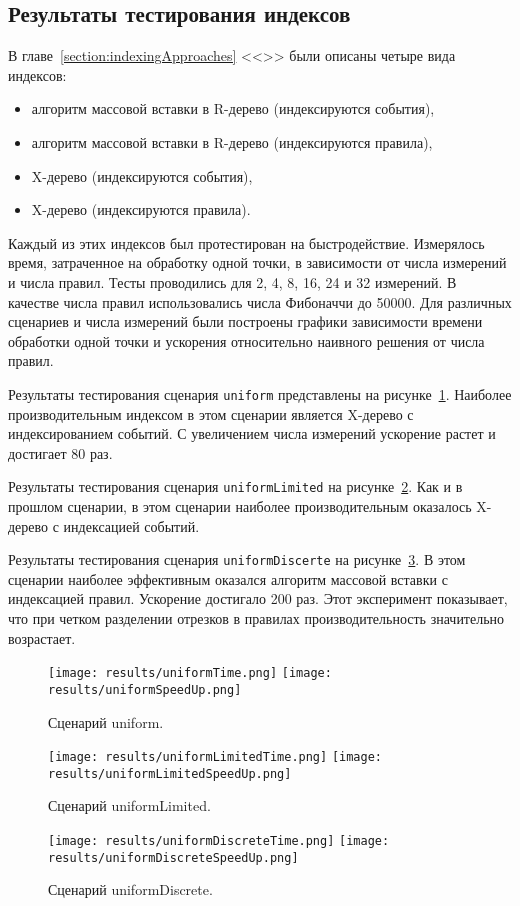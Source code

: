 \documentclass[14pt]{article}
\begin{document}
\subsection{Результаты тестирования индексов}
В главе~\ref{section:indexingApproaches} <<>> были описаны четыре вида индексов:
\begin{itemize}
    \item алгоритм массовой вставки в R-дерево (индексируются события),
    \item алгоритм массовой вставки в R-дерево (индексируются правила),
    \item X-дерево (индексируются события),
    \item X-дерево (индексируются правила).
\end{itemize}
Каждый из этих индексов был протестирован на быстродействие. Измерялось время, затраченное на обработку одной точки, в зависимости от числа измерений и числа правил. Тесты проводились для 2, 4, 8, 16, 24 и 32 измерений. В качестве числа правил использовались числа Фибоначчи до 50000. Для различных сценариев и числа измерений были построены графики зависимости времени обработки одной точки и ускорения относительно наивного решения от числа правил.

Результаты тестирования сценария \verb|uniform| представлены на рисунке~\ref{fig:uniform}. Наиболее производительным индексом в этом сценарии является X-дерево с индексированием событий. С увеличением числа измерений ускорение растет и достигает 80 раз.

Результаты тестирования сценария \verb|uniformLimited| на рисунке~\ref{fig:uniformLimited}. Как и в прошлом сценарии, в этом сценарии наиболее производительным оказалось X-дерево с индексацией событий.

Результаты тестирования сценария \verb|uniformDiscerte| на рисунке~\ref{fig:uniformDiscrete}. В этом сценарии наиболее эффективным оказался алгоритм массовой вставки с индексацией правил. Ускорение достигало 200 раз. Этот эксперимент показывает, что при четком разделении отрезков в правилах производительность значительно возрастает.

\begin{figure}[H]
  \centering
    \texttt{[image: results/uniformTime.png]}    \texttt{[image: results/uniformSpeedUp.png]}
    \caption{Сценарий uniform.}
    \label{fig:uniform}
\end{figure}
\newpage
\begin{figure}[H]
  \centering
    \texttt{[image: results/uniformLimitedTime.png]}    \texttt{[image: results/uniformLimitedSpeedUp.png]}
    \caption{Сценарий uniformLimited.}
    \label{fig:uniformLimited}
\end{figure}
\newpage
\begin{figure}[H]
  \centering
    \texttt{[image: results/uniformDiscreteTime.png]}    \texttt{[image: results/uniformDiscreteSpeedUp.png]}
    \caption{Сценарий uniformDiscrete.}
    \label{fig:uniformDiscrete}
\end{figure}
\newpage
\end{document}
